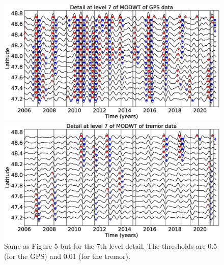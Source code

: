 \documentclass{article}
\begin{document}
\begin{figure}
\noindent\includegraphics[width=\textwidth, trim={0cm 0cm 0cm 0cm},clip]{figures/GPS_longer_detail_7.eps}

\noindent\includegraphics[width=\textwidth, trim={0cm 0cm 0cm 0cm},clip]{figures/tremor_longer_detail_7.eps}
\caption{Same as Figure 5 but for the 7th level detail. The thresholds are 0.5 (for the GPS) and 0.01 (for the tremor).}
\label{pngfiguresample}
\end{figure}
\end{document}
